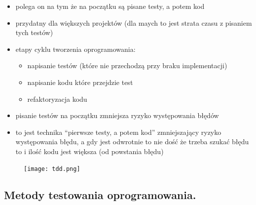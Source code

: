 \documentclass[a4paper,12pt,oneside]{book}
\begin{document}
\begin{enumerate}
				\begin{itemize}
					\item polega on na tym że na początku są pisane testy, a potem kod
					\item przydatny dla większych projektów (dla maych to jest strata czasu z pisaniem
					tych testów)
					\item etapy cyklu tworzenia oprogramowania:
					\begin{itemize}
						\item napisanie testów (które nie przechodzą przy braku implementacji)
						\item napisanie kodu które przejdzie test
						\item refaktoryzacja kodu
					\end{itemize}
					\item pisanie testów na początku zmniejsza ryzyko występowania błędów
					\item to jest technika “pierwsze testy, a potem kod” zmniejszający ryzyko
					występowania błędu, a gdy jest odwrotnie to nie dość że trzeba szukać błędu
					to i ilość kodu jest większa (od powstania błędu)
				\end{itemize}
				\begin{figure}[h!]
					\centering\texttt{[image: tdd.png]}
				\end{figure}
				\end{enumerate}
			\newpage\subsection{Metody testowania oprogramowania.}
\end{document}
